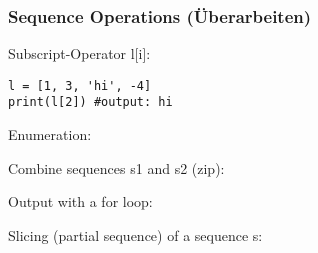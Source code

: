 \subsubsection{Sequence Operations (Überarbeiten)} \label{section_sequence_operations}
Subscript-Operator l[i]:
\begin{lstlisting}
l = [1, 3, 'hi', -4]
print(l[2]) #output: hi
\end{lstlisting}
Enumeration:

Combine sequences s1 and s2 (zip):

Output with a for loop:

Slicing (partial sequence) of a sequence s:
